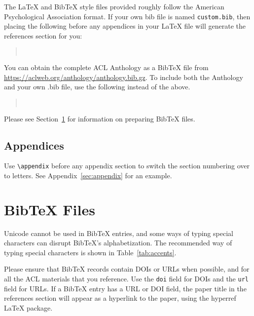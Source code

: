 \documentclass[11pt]{article}
\begin{document}
\nocite{Ando2005,augenstein-etal-2016-stance,andrew2007scalable,rasooli-tetrault-2015,goodman-etal-2016-noise,harper-2014-learning}

The \LaTeX{} and Bib\TeX{} style files provided roughly follow the American Psychological Association format.
If your own bib file is named \texttt{custom.bib}, then placing the following before any appendices in your \LaTeX{} file will generate the references section for you:
\begin{quote}
\begin{verbatim}


\end{verbatim}
\end{quote}
You can obtain the complete ACL Anthology as a Bib\TeX{} file from \url{https://aclweb.org/anthology/anthology.bib.gz}.
To include both the Anthology and your own .bib file, use the following instead of the above.
\begin{quote}
\begin{verbatim}


\end{verbatim}
\end{quote}
Please see Section~\ref{sec:bibtex} for information on preparing Bib\TeX{} files.

\subsection{Appendices}

Use \verb|\appendix| before any appendix section to switch the section numbering over to letters. See Appendix~\ref{sec:appendix} for an example.

\section{Bib\TeX{} Files}
\label{sec:bibtex}

Unicode cannot be used in Bib\TeX{} entries, and some ways of typing special characters can disrupt Bib\TeX's alphabetization. The recommended way of typing special characters is shown in Table~\ref{tab:accents}.

Please ensure that Bib\TeX{} records contain DOIs or URLs when possible, and for all the ACL materials that you reference.
Use the \verb|doi| field for DOIs and the \verb|url| field for URLs.
If a Bib\TeX{} entry has a URL or DOI field, the paper title in the references section will appear as a hyperlink to the paper, using the hyperref \LaTeX{} package.
\end{document}
